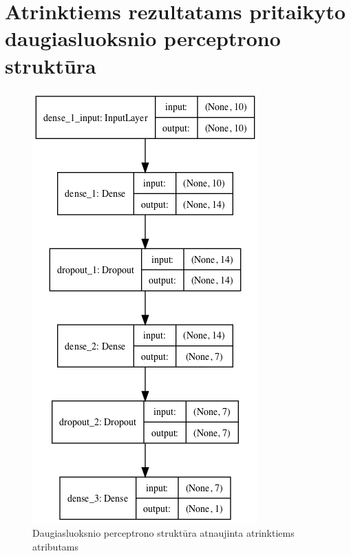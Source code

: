 \documentclass{VUMIFPSbakalaurinis}
\begin{document}
\section{Atrinktiems rezultatams pritaikyto daugiasluoksnio perceptrono struktūra}
\begin{figure}[H]
    \centering
    \includegraphics[scale=0.9]{img/model_adjusted}
    \caption{Daugiasluoksnio perceptrono struktūra atnaujinta atrinktiems atributams}
    \label{img:model_adj}
\end{figure}
\end{document}
